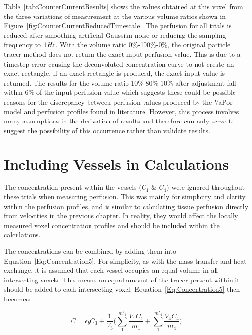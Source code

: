 \documentclass[11pt,english,a4paper,twoside,openright]{report}
\newcommand\Hertz{\mbox{\textit{Hz}}}
\begin{document}
{{{{{{{Table~\ref{tab:CounterCurrentResults} shows the values obtained at this voxel from the three variations of measurement at the various volume ratios shown in Figure~\ref{fig:CounterCurrentReducedTimescale}. The perfusion for all trials is reduced after smoothing artificial Gaussian noise or reducing the sampling frequency to $1\Hertz$. With the volume ratio 0\%-100\%-0\%, the original particle tracer method does not return the exact input perfusion value. This is due to a timestep error causing the deconvoluted concentration curve to not create an exact rectangle. If an exact rectangle is produced, the exact input value is returned. The results for the volume ratio 10\%-80\%-10\% after adjustment fall within 6\% of the input perfusion value which suggests these could be possible reasons for the discrepancy between perfusion values produced by the VaPor model and perfusion profiles found in literature. However, this process involves many assumptions in the derivation of results and therefore can only serve to suggest the possibility of this occurrence rather than validate results.  

\section[Including Vessels in Calculations]{{\Large I}ncluding {\Large V}essels in {\Large C}alculations}
\label{Sec:4IncludingVessels}

The concentration present within the vessels ($C_{1}$ \& $C_{4}$) were ignored throughout these trials when measuring perfusion. This was mainly for simplicity and clarity within the perfusion profiles, and is similar to calculating tissue perfusion directly from velocities in the previous chapter. In reality, they would affect the locally measured voxel concentration profiles and should be included within the calculations.

The concentrations can be combined by adding them into Equation~\ref{Eq:Concentration5}. For simplicity, as with the mass transfer and heat exchange, it is assumed that each vessel occupies an equal volume in all intersecting voxels. This means an equal amount of the tracer present within it should be added to each intersecting voxel.
Equation~\ref{Eq:Concentration5} then becomes:

\begin{equation}
C=\epsilon_{b}C_{3} + \frac{1}{V_{3}}\bigg(\sum_{1}^{m'_{1}}\frac{V_{1}C_{1}}{m_{1}}+\sum_{1}^{m'_{4}}\frac{V_{4}C_{4}}{m_{4}}\bigg)
\label{Eq:AddedVesselConcentrations}
\end{equation}

}}}}}}}
\end{document}
